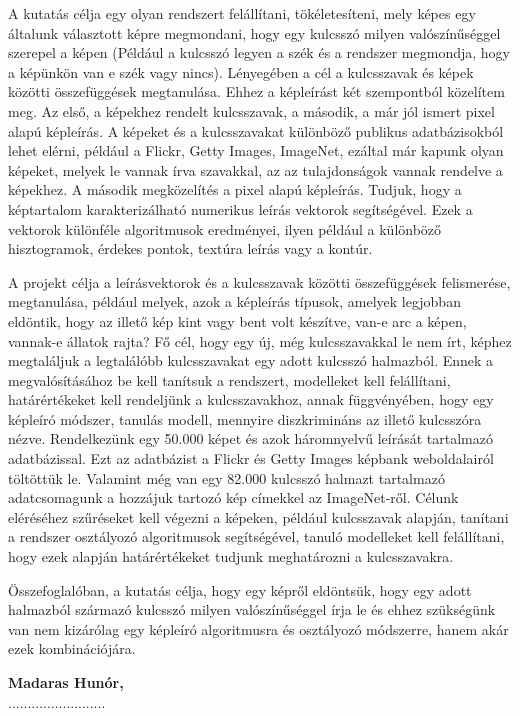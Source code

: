 \documentclass[12pt, a4paper, oneside]{book}
\theoremstyle{tetel}
\begin{document}
	A kutatás célja egy olyan rendszert felállítani, tökéletesíteni, mely képes egy általunk választott képre megmondani, hogy egy kulcsszó milyen valószínűséggel szerepel a képen (Például a kulcsszó legyen a szék és a rendszer megmondja, hogy a képünkön van e szék vagy nincs). Lényegében a cél a kulcsszavak és képek közötti összefüggések megtanulása. Ehhez a képleírást két szempontból közelítem meg. 
Az első, a képekhez rendelt kulcsszavak, a második, a már jól ismert pixel alapú képleírás. A képeket és a kulcsszavakat különböző publikus adatbázisokból lehet elérni, például a Flickr\cite{1}, Getty Images\cite{2}, ImageNet\cite{3}, ezáltal már kapunk olyan képeket, melyek le vannak írva szavakkal, az az tulajdonságok vannak rendelve a képekhez. A második megközelítés a pixel alapú képleírás. Tudjuk, hogy a képtartalom karakterizálható numerikus leírás vektorok segítségével. Ezek a vektorok különféle algoritmusok eredményei, ilyen például a különböző hisztogramok, érdekes pontok, textúra leírás vagy a kontúr. 

	A projekt célja a leírásvektorok és a kulcsszavak közötti összefüggések felismerése, megtanulása, például melyek, azok a képleírás típusok, amelyek legjobban eldöntik, hogy az illető kép kint vagy bent volt készítve, van-e arc a képen, vannak-e állatok rajta? Fő cél, hogy egy új, még kulcsszavakkal le nem írt, képhez megtaláljuk a legtalálóbb kulcsszavakat egy adott kulcsszó halmazból. Ennek a megvalósításához be kell tanítsuk a rendszert, modelleket kell felállítani, határértékeket kell rendeljünk a kulcsszavakhoz, annak függvényében, hogy egy képleíró módszer, tanulás modell, mennyire diszkrimináns az illető kulcsszóra nézve. Rendelkezünk egy 50.000 képet és azok háromnyelvű leírását tartalmazó adatbázissal. Ezt az adatbázist a Flickr\cite{1} és Getty Images\cite{2} képbank weboldalairól töltöttük le. Valamint még van egy 82.000 kulcsszó halmazt tartalmazó adatcsomagunk a hozzájuk tartozó kép címekkel az ImageNet-ről\cite{3}. Célunk eléréséhez szűréseket kell végezni a képeken, például kulcsszavak alapján, tanítani a rendszer osztályozó algoritmusok segítségével, tanuló modelleket kell felállítani, hogy ezek alapján határértékeket tudjunk meghatározni a kulcsszavakra.

Összefoglalóban, a kutatás célja, hogy egy képről eldöntsük, hogy egy adott halmazból származó kulcsszó milyen valószínűséggel írja le és ehhez szükségünk van nem kizárólag egy képleíró algoritmusra és osztályozó módszerre, hanem akár ezek kombinációjára.


\begin{flushright}
\textbf{Madaras Hunór,}\\
.........................
\end{flushright}
\end{document}
